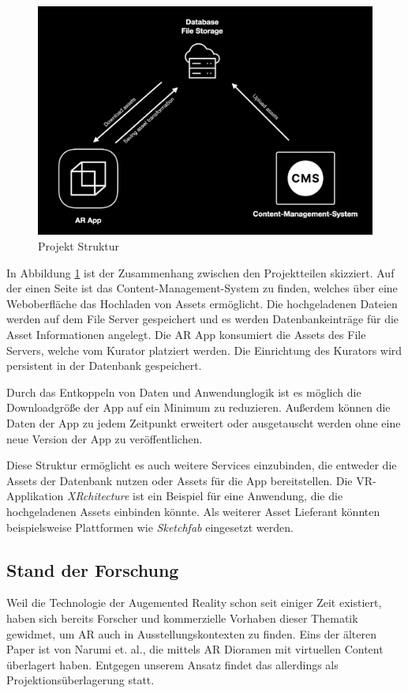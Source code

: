 \documentclass[titlepage, a4paper, 11pt]{scrartcl}
\begin{document}
  \begin{figure}[h]
    \centering
    \includegraphics[width=.6\textwidth]{project-structure}
    \caption{Projekt Struktur}
    \label{ProjektStruktur}
  \end{figure}

  In Abbildung \ref{ProjektStruktur} ist der Zusammenhang zwischen den Projektteilen skizziert.
  Auf der einen Seite ist das Content-Management-System zu finden, welches über eine Weboberfläche das Hochladen von Assets ermöglicht.
  Die hochgeladenen Dateien werden auf dem File Server gespeichert und es werden Datenbankeinträge für die Asset Informationen angelegt.
  Die AR App konsumiert die Assets des File Servers, welche vom Kurator platziert werden. Die Einrichtung des Kurators wird persistent in der Datenbank gespeichert. 
  
  Durch das Entkoppeln von Daten und Anwendunglogik ist es möglich die Downloadgröße der App auf ein Minimum zu reduzieren.
  Außerdem können die Daten der App zu jedem Zeitpunkt erweitert oder ausgetauscht werden ohne eine neue Version der App zu veröffentlichen. 

  Diese Struktur ermöglicht es auch weitere Services einzubinden, die entweder die Assets der Datenbank nutzen oder Assets für die App bereitstellen.
  Die VR-Applikation \textit{XRchitecture} ist ein Beispiel für eine Anwendung, die die hochgeladenen Assets einbinden könnte.
  Als weiterer Asset Lieferant könnten beispielsweise Plattformen wie \textit{Sketchfab} eingesetzt werden. 

    \subsection{Stand der Forschung}

      Weil die Technologie der Augemented Reality schon seit einiger Zeit existiert, haben sich bereits Forscher und kommerzielle Vorhaben dieser Thematik gewidmet,
      um AR auch in Ausstellungskontexten zu finden. 
      Eins der älteren Paper ist von Narumi et. al.\cite{narumi2011digital}, die mittels AR Dioramen mit virtuellen Content überlagert haben.
      Entgegen unserem Ansatz findet das allerdings als Projektionsüberlagerung statt.
\end{document}
